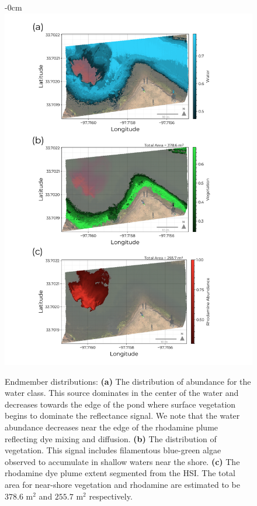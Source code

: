 \documentclass[remotesensing,article,submit,pdftex,moreauthors]{Definitions/mdpi}
\begin{document}
\newpage
\begin{figure}[H]
\begin{adjustwidth}{-\extralength}{0cm}
\centering
\includegraphics[width=\columnwidth]{results/robot-team/endmember-abundances.pdf}
\caption{Endmember distributions: \textbf{(a)} The distribution of abundance for the water class. This source dominates in the center of the water and decreases towards the edge of the pond where surface vegetation begins to dominate the reflectance signal. We note that the water abundance decreases near  the edge of the rhodamine plume reflecting dye mixing and diffusion. \textbf{(b)} The distribution of vegetation. This signal includes filamentous blue-green algae observed to accumulate in shallow waters near the shore. \textbf{(c)} The rhodamine dye plume extent segmented from the HSI. The total area for near-shore vegetation and rhodamine are estimated to be $378.6$ $\text{m}^2$ and $255.7$ $\text{m}^2$ respectively.}
\end{adjustwidth}
\label{fig:endmember-abundance-dist}
\end{figure}  
\newpage
\end{document}

